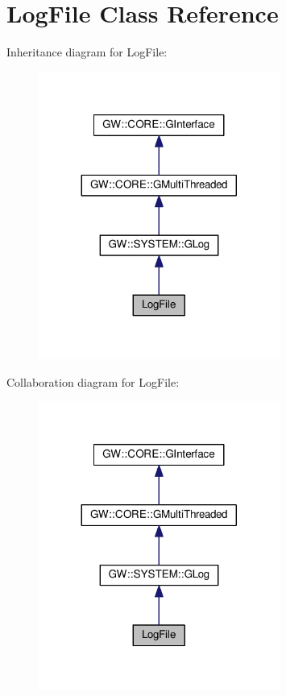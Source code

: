 \hypertarget{classLogFile}{}\section{Log\+File Class Reference}
\label{classLogFile}


Inheritance diagram for Log\+File\+:
\nopagebreak
\begin{figure}[H]
\begin{center}
\leavevmode
\includegraphics[width=224pt]{classLogFile__inherit__graph}
\end{center}
\end{figure}


Collaboration diagram for Log\+File\+:
\nopagebreak
\begin{figure}[H]
\begin{center}
\leavevmode
\includegraphics[width=224pt]{classLogFile__coll__graph}
\end{center}
\end{figure}
